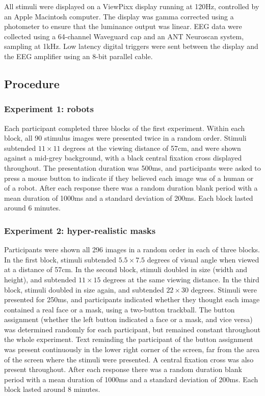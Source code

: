 \documentclass[
]{article}
\begin{document}
All stimuli were displayed on a ViewPixx display running at 120Hz, controlled by an Apple Macintosh computer. The display was gamma corrected using a photometer to ensure that the luminance output was linear. EEG data were collected using a 64-channel Waveguard cap and an ANT Neuroscan system, sampling at 1kHz. Low latency digital triggers were sent between the display and the EEG amplifier using an 8-bit parallel cable.

\hypertarget{procedure}{%
\subsection{Procedure}\label{procedure}}

\hypertarget{experiment-1-robots}{%
\subsubsection{Experiment 1: robots}\label{experiment-1-robots}}

Each participant completed three blocks of the first experiment. Within each block, all 90 stimulus images were presented twice in a random order. Stimuli subtended \(11\times11\) degrees at the viewing distance of 57cm, and were shown against a mid-grey background, with a black central fixation cross displayed throughout. The presentation duration was 500ms, and participants were asked to press a mouse button to indicate if they believed each image was of a human or of a robot. After each response there was a random duration blank period with a mean duration of 1000ms and a standard deviation of 200ms. Each block lasted around 6 minutes.

\hypertarget{experiment-2-hyper-realistic-masks}{%
\subsubsection{Experiment 2: hyper-realistic masks}\label{experiment-2-hyper-realistic-masks}}

Participants were shown all 296 images in a random order in each of three blocks. In the first block, stimuli subtended \(5.5\times7.5\) degrees of visual angle when viewed at a distance of 57cm. In the second block, stimuli doubled in size (width and height), and subtended \(11\times15\) degrees at the same viewing distance. In the third block, stimuli doubled in size again, and subtended \(22\times30\) degrees. Stimuli were presented for 250ms, and participants indicated whether they thought each image contained a real face or a mask, using a two-button trackball. The button assignment (whether the left button indicated a face or a mask, and vice versa) was determined randomly for each participant, but remained constant throughout the whole experiment. Text reminding the participant of the button assignment was present continuously in the lower right corner of the screen, far from the area of the screen where the stimuli were presented. A central fixation cross was also present throughout. After each response there was a random duration blank period with a mean duration of 1000ms and a standard deviation of 200ms. Each block lasted around 8 minutes.
\end{document}
